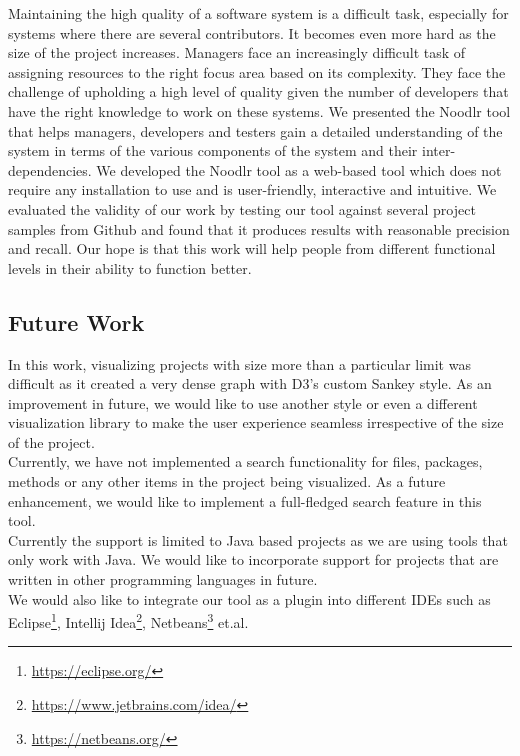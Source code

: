 Maintaining the high quality of a software system is a difficult task, especially for systems where there are several contributors. It becomes even more hard as the size of the project increases. Managers face an increasingly difficult task of assigning resources to the right focus area based on its complexity. They face the challenge of upholding a high level of quality given the number of developers that have the right knowledge to work on these systems. We presented the Noodlr tool that helps managers, developers and testers gain a detailed understanding of the system in terms of the various components of the system and their inter-dependencies. We developed the Noodlr tool as a web-based tool which does not require any installation to use and is user-friendly, interactive and intuitive. We evaluated the validity of our work by testing our tool against several project samples from Github and found that it produces results with reasonable precision and recall. Our hope is that this work will help people from different functional levels in their ability to function better.\\

\subsection{Future Work}
\label{sec:future}
In this work, visualizing projects with size more than a particular limit was difficult as it created a very dense graph with D3's custom Sankey style. As an improvement in future, we would like to use another style or even a different visualization library to make the user experience seamless irrespective of the size of the project. \\

Currently, we have not implemented a search functionality for files, packages, methods or any other items in the project being visualized. As a future enhancement, we would like to implement a full-fledged search feature in this tool. \\

Currently the support is limited to Java based projects as we are using tools that only work with Java. We would like to incorporate support for projects that are written in other programming languages in future.\\

We would also like to integrate our tool as a plugin into different IDEs such as Eclipse\footnote{\url{https://eclipse.org/}}, Intellij Idea\footnote{\url{https://www.jetbrains.com/idea/}}, Netbeans\footnote{\url{https://netbeans.org/}} et.al.

